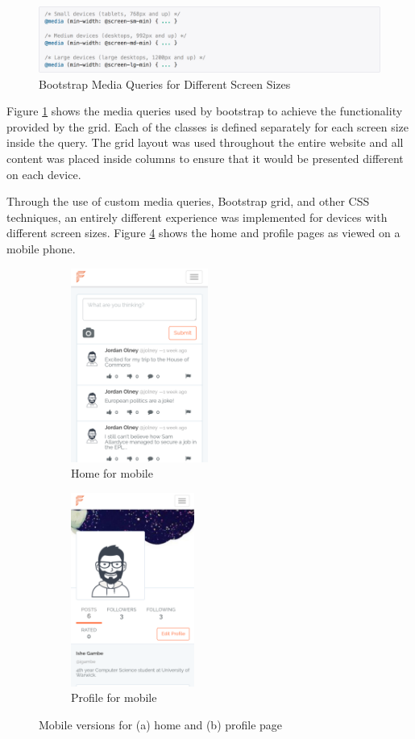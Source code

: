 \begin{figure}[H]
\centering
\includegraphics[width=1.0\textwidth]{images/Implementation/MediaQueries}
\caption{Bootstrap Media Queries for Different Screen Sizes} \label{fig:MediaQueries}
\end{figure}

Figure \ref{fig:MediaQueries} shows the media queries used by bootstrap to achieve the functionality provided by the grid. Each of the classes is defined separately for each screen size inside the query. The grid layout was used throughout the entire website and all content was placed inside columns to ensure that it would be presented different on each device.

Through the use of custom media queries, Bootstrap grid, and other CSS techniques, an entirely different experience was implemented for devices with different screen sizes. Figure \ref{fig:MobileView} shows the home and profile pages as viewed on a mobile phone.

\begin{figure}[H]
	\centering
	\begin{subfigure}[t]{0.45\textwidth}
		\centering
		\includegraphics[height=2.5in]{images/Implementation/MobileHome}
		\caption{Home for mobile}\label{fig:MobileHome}		
	\end{subfigure}
	\quad
	\begin{subfigure}[t]{0.45\textwidth}
		\centering
		\includegraphics[height=2.5in]{images/Implementation/MobileProfile}
		\caption{Profile for mobile}\label{fig:MobileProfile}
	\end{subfigure}
	\caption{Mobile versions for (a) home and (b) profile page}\label{fig:MobileView}
\end{figure}